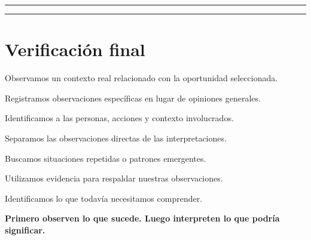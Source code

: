 \documentclass[12pt,a4paper]{article}
\newcommand{\checkbox}{\fbox{\rule{0pt}{0.8ex}\rule{0.8ex}{0pt}}}
\begin{document}
	\vspace{0.1cm}
	
	\rule{\linewidth}{0.4pt}
	
	\vspace{0.35cm}
	
	\rule{\linewidth}{0.4pt}
	
	\section*{Verificación final}
	
	\checkbox\quad Observamos un contexto real relacionado con la oportunidad seleccionada.
	
	\vspace{0.15cm}
	
	\checkbox\quad Registramos observaciones específicas en lugar de opiniones generales.
	
	\vspace{0.15cm}
	
	\checkbox\quad Identificamos a las personas, acciones y contexto involucrados.
	
	\vspace{0.15cm}
	
	\checkbox\quad Separamos las observaciones directas de las interpretaciones.
	
	\vspace{0.15cm}
	
	\checkbox\quad Buscamos situaciones repetidas o patrones emergentes.
	
	\vspace{0.15cm}
	
	\checkbox\quad Utilizamos evidencia para respaldar nuestras observaciones.
	
	\vspace{0.15cm}
	
	\checkbox\quad Identificamos lo que todavía necesitamos comprender.
	
	\vspace{0.3cm}
	
	\begin{center}
		\textbf{Primero observen lo que sucede. Luego interpreten lo que podría significar.}
	\end{center}

	
\end{document}
